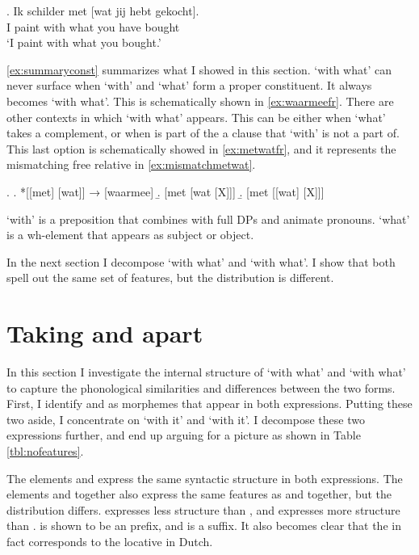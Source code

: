 \documentclass[12pt]{article}
\begin{document}
\exg. Ik schilder met [wat jij hebt gekocht].\\
 I paint with what you have bought\\
 `I paint with what you bought.'\label{ex:mismatchmetwat}

\ref{ex:summaryconst} summarizes what I showed in this section.  `with what' can never surface when  `with' and  `what' form a proper constituent. It always becomes  `with what'. This is schematically shown in \ref{ex:waarmeefr}.
There are other contexts in which  `with what' appears. This can be either when  `what' takes a complement, or when  is part of the a clause that  `with' is not a part of. This last option is schematically showed in \ref{ex:metwatfr}, and it represents the mismatching free relative in \ref{ex:mismatchmetwat}.

\ex.\label{ex:summaryconst}
\a. *[[met] [wat]] → [waarmee]\label{ex:waarmeefr}
\b. [met [wat [X]]]
\b. [met [[wat] [X]]]\label{ex:metwatfr}

 `with' is a preposition that combines with full DPs and animate pronouns.  `what' is a wh-element that appears as subject or object.

In the next section I decompose  `with what' and  `with what'. I show that both spell out the same set of features, but the distribution is different.



\section{Taking  and  apart}

In this section I investigate the internal structure of  `with what' and  `with what' to capture the phonological similarities and differences between the two forms. First, I identify  and  as morphemes that appear in both expressions. Putting these two aside, I concentrate on  `with it' and  `with it'. I decompose these two expressions further, and end up arguing for a picture as shown in Table \ref{tbl:nofeatures}.

The elements  and  express the same syntactic structure in both expressions. The elements  and  together also express the same features as  and  together, but the distribution differs.  expresses less structure than , and  expresses more structure than .  is shown to be an prefix, and  is a suffix. It also becomes clear that the  in fact corresponds to the locative  in Dutch.
\end{document}
